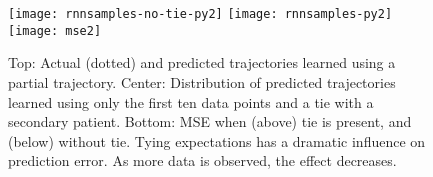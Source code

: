 \begin{figure}[!htb]
	\centering
	\texttt{[image: rnnsamples-no-tie-py2]}
	\texttt{[image: rnnsamples-py2]}
	\texttt{[image: mse2]}
		
		\caption{Top: Actual (dotted) and predicted trajectories learned using a partial trajectory. Center: Distribution of predicted trajectories learned using only the first ten data points and a tie with a secondary patient. Bottom: MSE when (above) tie is present, and (below) without tie.  Tying expectations has a dramatic influence on prediction error. As more data is observed, the effect decreases.}
		\label{fig:rnn-samples}
		\vspace{-1em}
\end{figure}







